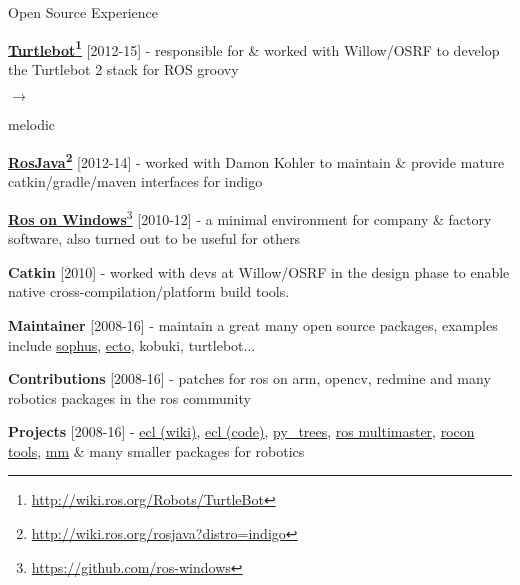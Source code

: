 \documentclass[a4paper,10pt]{article}
\begin{document}
\begin{cvsection}{Open Source Experience}
 \raggedright
  \begin{djs_itemize}
    \item \textbf{\href{http://wiki.ros.org/Robots/TurtleBot}{Turtlebot}\footnote{\href{http://wiki.ros.org/Robots/TurtleBot}{http://wiki.ros.org/Robots/TurtleBot}}} [2012-15] - responsible for \& worked with Willow/OSRF to develop the Turtlebot 2 stack for ROS groovy \begin{small}$\rightarrow$\end{small} melodic
    \item \textbf{\href{http://wiki.ros.org/rosjava?distro=indigo}{RosJava}\footnote{\href{http://wiki.ros.org/rosjava?distro=indigo}{http://wiki.ros.org/rosjava?distro=indigo}}} [2012-14] - worked with Damon Kohler to maintain \& provide mature catkin/gradle/maven interfaces for indigo
    \item \textbf{\href{https://github.com/ros-windows}{Ros on Windows}}\footnote{\href{https://github.com/ros-windows}{https://github.com/ros-windows}} [2010-12] - a minimal environment for company \& factory software, also turned out to be useful for others
    \item \textbf{Catkin} [2010] - worked with devs at Willow/OSRF in the design phase to enable native cross-compilation/platform build tools.
    \item \textbf{Maintainer} [2008-16] - maintain a great many open source packages, examples include \href{https://github.com/stonier/sophus}{sophus}, \href{https://github.com/plasmodic/ecto}{ecto}, kobuki, turtlebot...
    \item \textbf{Contributions} [2008-16] - patches for ros on arm, opencv, redmine and many robotics packages in the ros community
    \item \textbf{Projects} [2008-16] - \href{http://wiki.ros.org/ecl}{ecl (wiki)}, \href{https://github.com/stonier/ecl_core}{ecl (code)}, \href{https://github.com/stonier/py_trees_suite}{py\_trees}, \href{https://github.com/robotics-in-concert/rocon_multimaster}{ros multimaster}, \href{https://github.com/robotics-in-concert/rocon_tools}{rocon tools}, \href{https://github.com/stonier/message_multiplexing}{mm} \& many smaller packages for robotics
  \end{djs_itemize}
\end{cvsection}
\end{document}
